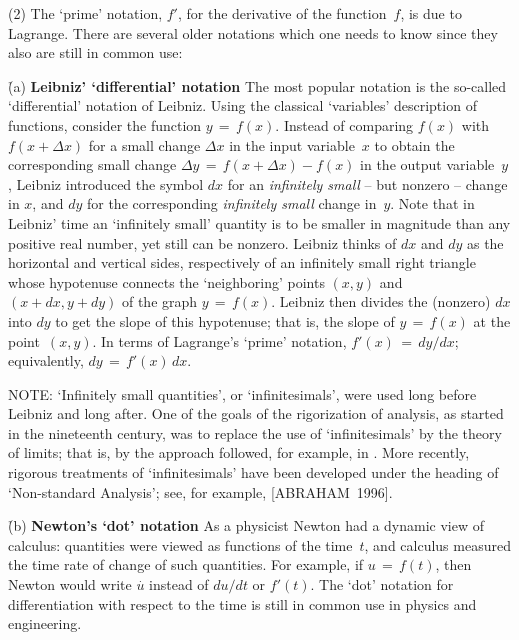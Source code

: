 \V

        (2) The `prime' notation, $f'$, for the derivative of the function~$f$, is due to Lagrange.
    There are several older notations which one needs to know since they also are still in common use:

\VA

        \h (a) {\bf Leibniz' `differential' notation} The most popular notation is the so-called `differential' notation of Leibniz.
     Using the classical `variables' description of functions,
    consider the function $y \,=\, f(x)$. Instead of comparing $f(x)$ with $f(x+{\Delta}x)$ for a small change ${\Delta}x$ in the input variable~$x$
    to obtain the corresponding small change ${\Delta}y \,=\, f(x+{\Delta}x)-f(x)$ in the output variable~$y$,
    Leibniz introduced the symbol $dx$ for an {\em infinitely small} -- but nonzero -- change in $x$, and $dy$ for the corresponding {\em infinitely small} change in~$y$.
    Note that in Leibniz' time an `infinitely small' quantity is to be smaller in magnitude than any positive real number, yet still can be nonzero.
    Leibniz thinks of $dx$ and $dy$ as the horizontal and vertical sides, respectively of an infinitely small right triangle
    whose hypotenuse connects the `neighboring' points $(x,y)$ and $(x+dx,y+dy)$ of the graph $y \,=\, f(x)$. 
    Leibniz then divides the (nonzero) $dx$ into $dy$ to get the slope of this hypotenuse; that is, the slope of $y \,=\, f(x)$ at the point~$(x,y)$.
    In terms of Lagrange's `prime' notation, $f'(x) \,=\, dy/dx$; equivalently, $dy \,=\, f'(x)\,dx$.

        NOTE: `Infinitely small quantities', or `infinitesimals', were used long before Leibniz and long after.
    One of the goals of the rigorization of analysis, as started in the nineteenth century, was to replace the use of `infinitesimals'
    by the theory of limits; that is, by the approach followed, for example, in {\ThisText}. More recently,
    rigorous treatments of `infinitesimals' have been developed under the heading of `Non-standard Analysis'; see, for example, [ABRAHAM~1996].

\VA

        \h (b) {\bf Newton's `dot' notation}
    As a physicist Newton had a dynamic view of calculus: quantities were viewed as functions of the time~$t$,
    and calculus measured the time rate of change of such quantities. For example, if $u \,=\, f(t)$,
    then Newton would write $\stackrel{.}{u}$ instead of $du/dt$ or $f'(t)$. The `dot' notation
    for differentiation with respect to the time is still in common use in physics and engineering.

